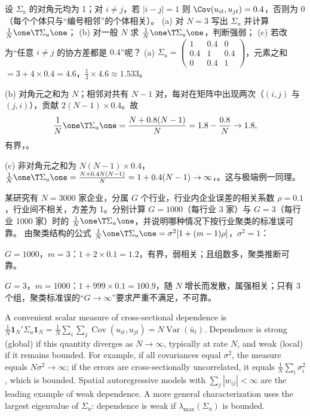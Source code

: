 \begin{prac}\label{prac:U13a-band}
设 $\Sigma_u$ 的对角元均为 1；对 $i\neq j$，若 $|i-j|=1$ 则 $\Cov(u_{it},u_{jt})=0.4$，否则为 0（每个个体只与“编号相邻”的个体相关）。
(a) 对 $N=3$ 写出 $\Sigma_u$ 并计算 $\frac1N\one\T\Sigma_u\one$；
(b) 对一般 $N$ 求 $\frac1N\one\T\Sigma_u\one$，判断强弱；
(c) 若改为“任意 $i\neq j$ 的协方差都是 $0.4$”呢？
\answer
(a) $\Sigma_u=\begin{pmatrix}1&0.4&0\\0.4&1&0.4\\0&0.4&1\end{pmatrix}$，元素之和 $=3+4\times0.4=4.6$，$\frac13\times4.6\approx1.533$。

(b) 对角元之和为 $N$；相邻对共有 $N-1$ 对，每对在矩阵中出现两次（$(i,j)$ 与 $(j,i)$），贡献 $2(N-1)\times0.4$。故
\[
\frac1N\one\T\Sigma_u\one=\frac{N+0.8(N-1)}N=1.8-\frac{0.8}N\to1.8,
\]
有界，。

(c) 非对角元之和为 $N(N-1)\times0.4$，$\frac1N\one\T\Sigma_u\one=\frac{N+0.4N(N-1)}{N}=1+0.4(N-1)\to\infty$，。这与极端例一同理。
\end{prac}

\begin{prac}[聚类与强弱相关]\label{prac:U13a-clusternum}
某研究有 $N=3000$ 家企业，分属 $G$ 个行业，行业内企业误差的相关系数 $\rho=0.1$，行业间不相关，方差为 1。分别计算 $G=1000$（每行业 3 家）与 $G=3$（每行业 1000 家）时的 $\frac1N\one\T\Sigma_u\one$，并说明哪种情况下按行业聚类的标准误可靠。
\answer
由聚类结构的公式 $\frac1N\one\T\Sigma_u\one=\sigma^2[1+(m-1)\rho]$，$\sigma^2=1$：

$G=1000$，$m=3$：$1+2\times0.1=1.2$，有界，弱相关；且组数多，聚类推断可靠。

$G=3$，$m=1000$：$1+999\times0.1=100.9$，随 $N$ 增长而发散，属强相关；只有 3 个组，聚类标准误的“$G\to\infty$”要求严重不满足，不可靠。
\end{prac}

\begin{english}
A convenient scalar measure of cross-sectional dependence is $\frac1N\mathbf 1_N'\Sigma_u\mathbf 1_N=\frac1N\sum_i\sum_j\operatorname{Cov}(u_{it},u_{jt})=N\operatorname{Var}(\bar u_t)$. Dependence is strong (global) if this quantity diverges as $N\to\infty$, typically at rate $N$, and weak (local) if it remains bounded. For example, if all covariances equal $\sigma^2$, the measure equals $N\sigma^2\to\infty$; if the errors are cross-sectionally uncorrelated, it equals $\frac1N\sum_i\sigma_i^2$, which is bounded. Spatial autoregressive models with $\sum_j|w_{ij}|<\infty$ are the leading example of weak dependence. A more general characterization uses the largest eigenvalue of $\Sigma_u$: dependence is weak if $\lambda_{\max}(\Sigma_u)$ is bounded.
\end{english}

